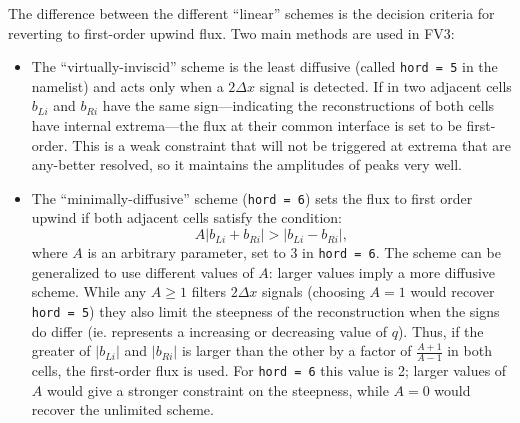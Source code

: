 \documentclass[10pt,letterpaper,margin=1in]{memoir}
\begin{document}
The difference between the different ``linear'' schemes is the decision criteria for reverting to first-order upwind flux. Two main methods are used in FV3:
\begin{itemize}
\item The ``virtually-inviscid'' scheme is the least diffusive (called \texttt{hord = 5} in the namelist) and acts only when a $2\Delta x$ signal is detected. If in two adjacent cells $b_{Li}$ and $b_{Ri}$ have the same sign---indicating the reconstructions of both cells have internal extrema---the flux at their common interface is set to be first-order. This is a weak constraint that will not be triggered at extrema that are any-better resolved, so it maintains the amplitudes of peaks very well. 
\item The ``minimally-diffusive'' scheme (\texttt{hord = 6}) sets the flux to first order upwind if both adjacent cells satisfy the condition:
\begin{equation}
A \left | b_{Li} + b_{Ri} \right | > \left | b_{Li} - b_{Ri} \right |,
\end{equation}
where $A$ is an arbitrary parameter, set to 3 in \texttt{hord = 6}. The scheme can be generalized to use different values of $A$: larger values imply a more diffusive scheme. While any $A \ge 1$ filters $2\Delta x$ signals (choosing $A = 1$ would recover \texttt{hord = 5}) they also limit the steepness of the reconstruction when the signs do differ (ie. represents a increasing or decreasing value of $q$). Thus, if the greater of $\left | b_{Li} \right |$ and $\left | b_{Ri} \right |$ is larger than the other by a factor of $\frac{A + 1}{A - 1}$ in both cells, the first-order flux is used. For \texttt{hord = 6} this value is 2; larger values of $A$ would give a stronger constraint on the steepness, while $A = 0$ would recover the unlimited scheme.
\end{itemize}
\end{document}
